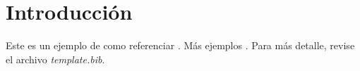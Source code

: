 \chapter{Introducción}

Este es un ejemplo de como referenciar \cite{bharat97,agrawal94}.
Más ejemplos \cite{beeferman00}. Para más detalle, revise el archivo \textit{template.bib}. 
